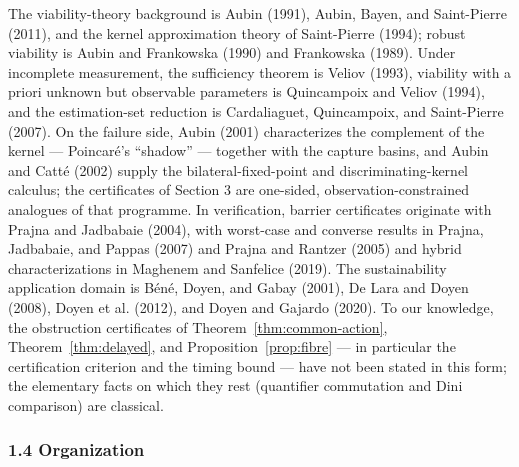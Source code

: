 \documentclass[10pt,twocolumn]{article}
\theoremstyle{definition}
\begin{document}
The viability-theory background is Aubin (1991), Aubin, Bayen, and Saint-Pierre (2011), and the kernel approximation theory of Saint-Pierre (1994); robust viability is Aubin and Frankowska (1990) and Frankowska (1989). Under incomplete measurement, the sufficiency theorem is Veliov (1993), viability with a priori unknown but observable parameters is Quincampoix and Veliov (1994), and the estimation-set reduction is Cardaliaguet, Quincampoix, and Saint-Pierre (2007). On the failure side, Aubin (2001) characterizes the complement of the kernel --- Poincar\'e's ``shadow'' --- together with the capture basins, and Aubin and Catt\'e (2002) supply the bilateral-fixed-point and discriminating-kernel calculus; the certificates of Section 3 are one-sided, observation-constrained analogues of that programme. In verification, barrier certificates originate with Prajna and Jadbabaie (2004), with worst-case and converse results in Prajna, Jadbabaie, and Pappas (2007) and Prajna and Rantzer (2005) and hybrid characterizations in Maghenem and Sanfelice (2019). The sustainability application domain is B\'en\'e, Doyen, and Gabay (2001), De Lara and Doyen (2008), Doyen et al. (2012), and Doyen and Gajardo (2020). To our knowledge, the obstruction certificates of Theorem~\ref{thm:common-action}, Theorem~\ref{thm:delayed}, and Proposition~\ref{prop:fibre} --- in particular the certification criterion and the timing bound --- have not been stated in this form; the elementary facts on which they rest (quantifier commutation and Dini comparison) are classical.

\subsubsection{1.4 Organization}\label{organization}
\end{document}
